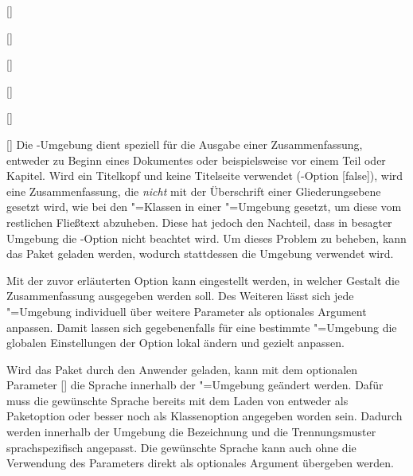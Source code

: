 \begin{Declaration*}{}
\begin{Declaration*}{}
\begin{Declaration*}{}
\begin{Declaration}{[]}
\begin{Declaration}[v2.02]{}
\begin{Declaration}{[]}
\begin{Declaration}[v2.02]{%
  []%
}
\begin{Declaration}[v2.02]{%
  []%
}
\begin{Declaration}{[]}
\begin{Declaration}{[\PSet]}{%
}
\printdeclarationlist%
%
%
Die -Umgebung dient speziell für die Ausgabe einer 
Zusammenfassung, entweder zu Beginn eines Dokumentes oder beispielsweise vor 
einem Teil oder Kapitel. Wird ein Titelkopf und keine Titelseite verwendet 
(\KOMAScript-Option [false]), wird eine Zusammenfassung, die  
\emph{nicht} mit der Überschrift einer Gliederungsebene gesetzt wird, wie bei 
den \KOMAScript"=Klassen in einer "=Umgebung gesetzt, um 
diese vom restlichen Fließtext abzuheben. Diese hat jedoch den Nachteil, dass 
in besagter Umgebung die \KOMAScript-Option  nicht beachtet 
wird. Um dieses Problem zu beheben, kann das Paket  geladen 
werden, wodurch stattdessen die Umgebung  verwendet wird.

Mit der zuvor erläuterten Option  kann eingestellt werden, in 
welcher Gestalt die Zusammenfassung ausgegeben werden soll. Des Weiteren lässt 
sich jede "=Umgebung individuell über weitere Parameter 
als optionales Argument anpassen. Damit lassen sich gegebenenfalls für eine 
bestimmte "=Umgebung die globalen Einstellungen 
der Option  lokal ändern und gezielt anpassen. 

Wird das Paket  durch den Anwender geladen, kann mit dem 
optionalen Parameter [] 
die Sprache innerhalb der "=Umgebung geändert werden. 
Dafür muss die gewünschte Sprache bereits mit dem Laden von  
entweder als Paketoption oder besser noch als Klassenoption angegeben worden 
sein. Dadurch werden innerhalb der Umgebung die Bezeichnung  
und die Trennungsmuster sprachspezifisch angepasst. Die gewünschte Sprache kann 
auch ohne die Verwendung des Parameters  
direkt als optionales Argument übergeben werden.


\end{Declaration}
\end{Declaration}
\end{Declaration}
\end{Declaration}
\end{Declaration}
\end{Declaration}
\end{Declaration}
\end{Declaration*}
\end{Declaration*}
\end{Declaration*}
